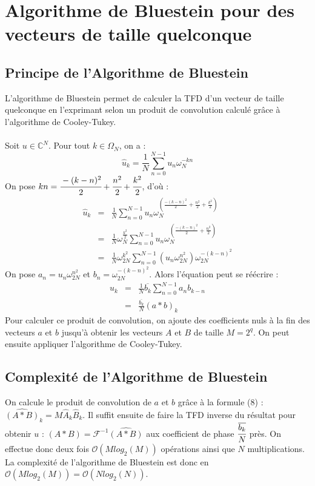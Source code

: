 \documentclass[12pt]{article}
\begin{document}
	\section{Algorithme de Bluestein pour des vecteurs de taille quelconque}
    	\subsection{Principe de l'Algorithme de Bluestein}
L'algorithme de Bluestein permet de calculer la TFD d'un vecteur de taille quelconque en l'exprimant selon un produit de convolution calculé grâce à l'algorithme de Cooley-Tukey.\\\\
Soit $u\in\mathbb{C}^N$. Pour tout $k\in\Omega_N$, on a :
\begin{equation*}
\hat{u}_k=\frac{1}{N}\sum_{n=0}^{N-1}u_n\omega_N^{-kn}
\end{equation*}
On pose $kn=\cfrac{-(k-n)^2}{2}+\cfrac{n^2}{2}+\cfrac{k^2}{2}$, d’où :
\begin{eqnarray*}
\hat{u}_k&=&\frac{1}{N}\sum_{n=0}^{N-1}u_n\omega_N^{(\frac{-(k-n)^2}{2}+\frac{n^2}{2}+\frac{k^2}{2})}\\
&=&\frac{1}{N}\omega_N^{\frac{k^2}{2}}\sum_{n=0}^{N-1}u_n\omega_N^{(\frac{-(k-n)^2}{2}
+\frac{n^2}{2})}\\
&=&\frac{1}{N}\omega_{2N}^{k^2}\sum_{n=0}^{N-1}(u_n\omega_{2N}^{n^2})\omega_{2N}^{-(k-n)^2}
\end{eqnarray*}
On pose $a_n=u_n\omega_{2N}^{n^2}$ et $b_n=\omega_{2N}^{-(k-n)^2}$. Alors l'équation peut se réécrire : \begin{eqnarray}
\hat{u}_k&=&\frac{1}{N}\overline{b_k}\sum_{n=0}^{N-1}a_nb_{k-n}\nonumber\\
&=&\frac{\overline{b_k}}{N}(a*b)_k
\end{eqnarray}
Pour calculer ce produit de convolution, on ajoute des coefficients nuls à la fin des vecteurs $a$ et $b$ jusqu'à obtenir les vecteurs $A$ et $B$ de taille $M=2^q$. On peut ensuite appliquer l'algorithme de Cooley-Tukey.
\subsection{Complexité de l'Algorithme de Bluestein}
On calcule le produit de convolution de $a$ et $b$ grâce à la formule (8) : $\widehat{(A\ast B)}_k=M\hat{A}_k\hat{B}_k$. Il suffit ensuite de faire la TFD inverse du résultat pour obtenir $u$ : $(A\ast B)=\mathcal{F}^{-1}\widehat{(A\ast B)}$ aux coefficient de phase $\cfrac{\overline{b_k}}{N}$ près. On effectue donc deux fois $\mathcal{O}(Mlog_2(M))$ opérations ainsi que $N$ multiplications. La complexité de l'algorithme de Bluestein est donc en $\mathcal{O}(Mlog_2(M))=\mathcal{O}(Nlog_2(N))$. 
\end{document}
